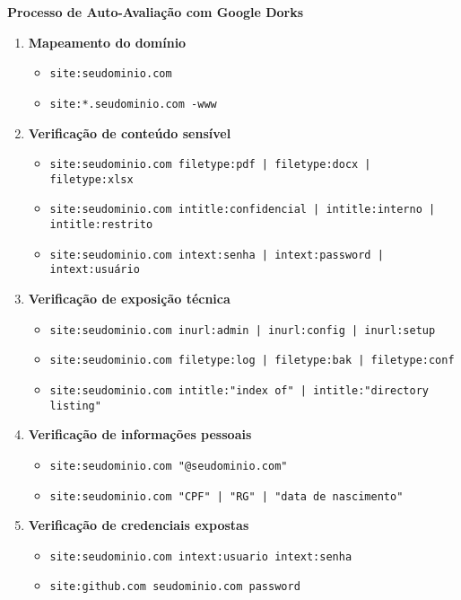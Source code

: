 \documentclass[12pt,a4paper]{book}
\begin{document}
\begin{mdframed}[backgroundcolor=verdeestabilidade!10, roundcorner=10pt, leftmargin=1cm, rightmargin=1cm]
\begin{center}
\textbf{\large Processo de Auto-Avaliação com Google Dorks}
\end{center}

\begin{enumerate}
    \item \textbf{Mapeamento do domínio}
    \begin{itemize}
        \item \texttt{site:seudominio.com}
        \item \texttt{site:*.seudominio.com -www}
    \end{itemize}
    
    \item \textbf{Verificação de conteúdo sensível}
    \begin{itemize}
        \item \texttt{site:seudominio.com filetype:pdf | filetype:docx | filetype:xlsx}
        \item \texttt{site:seudominio.com intitle:confidencial | intitle:interno | intitle:restrito}
        \item \texttt{site:seudominio.com intext:senha | intext:password | intext:usuário}
    \end{itemize}
    
    \item \textbf{Verificação de exposição técnica}
    \begin{itemize}
        \item \texttt{site:seudominio.com inurl:admin | inurl:config | inurl:setup}
        \item \texttt{site:seudominio.com filetype:log | filetype:bak | filetype:conf}
        \item \texttt{site:seudominio.com intitle:"index of" | intitle:"directory listing"}
    \end{itemize}
    
    \item \textbf{Verificação de informações pessoais}
    \begin{itemize}
        \item \texttt{site:seudominio.com "@seudominio.com"}
        \item \texttt{site:seudominio.com "CPF" | "RG" | "data de nascimento"}
    \end{itemize}
    
    \item \textbf{Verificação de credenciais expostas}
    \begin{itemize}
        \item \texttt{site:seudominio.com intext:usuario intext:senha}
        \item \texttt{site:github.com seudominio.com password}
    \end{itemize}
\end{enumerate}
\end{mdframed}
\end{document}
